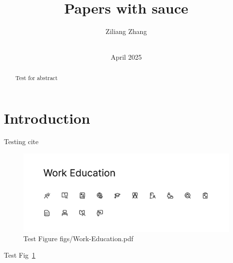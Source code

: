 \documentclass[10pt,conference]{IEEEtran}
\title{Papers with sauce}
\author{%
Ziliang Zhang\\
\affaddr{University of California, Riverside}\\
}
\date{April 2025}
\theoremstyle{definition}
\begin{document}
\maketitle

\thispagestyle{fancy}

\begin{abstract} 
Test for abstract
\end{abstract}

\section{Introduction}

Testing cite~\cite{nano}

\begin{figure}[t]
\includegraphics[width=\linewidth]{../figs/Work-Education.pdf}
\caption{Test Figure figs/Work-Education.pdf}
\label{fig:test}
\end{figure}

Test Fig~\ref{fig:test}



\end{document}
